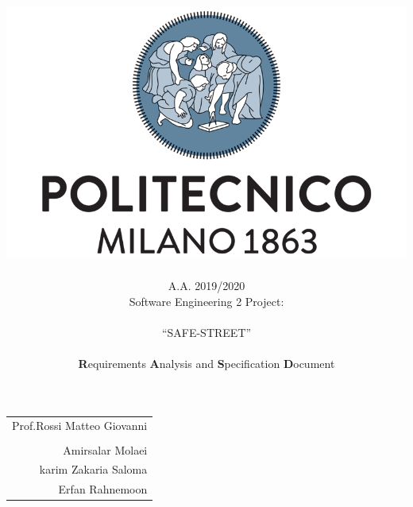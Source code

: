 \documentclass[english]{article}
\newcommand{\forcerighttext}[1]{
\vspace{0.2\textheight}
\par {\raggedleft \begin{tabular}{r}\ignorespaces
#1
\end{tabular}
\hspace{8em}
\vspace{1em}
\par}
}
\begin{document}
\begin{doublespace}

\title{\includegraphics[scale=0.4]{images/polimi}}

\author{A.A. 2019/2020\\
Software Engineering 2 Project: \\
\\
{\LARGE{}``SAFE-STREET''}\textbf{}\\
\\
\textbf{R}equirements \textbf{A}nalysis and \textbf{S}pecification
\textbf{D}ocument\\
}
\end{doublespace}

\maketitle
\thispagestyle{empty}
\forcerighttext{Prof.Rossi Matteo Giovanni\\
\\Amirsalar Molaei
\\karim Zakaria Saloma
\\Erfan Rahnemoon}


\newpage{}

\tableofcontents{}

\newpage

\listoffigures

\newpage

\listoftables

\newpage{}



\newpage{}



\newpage{}


\end{document}
